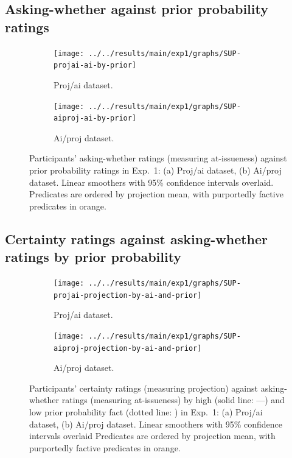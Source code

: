 \documentclass[11pt,fleqn]{article}
\newcommand{\6}{\mbox{$[\hspace*{-.6mm}[$}}
\newcommand{\9}{\mbox{$]\hspace*{-.6mm}]$}}
\begin{document}
\subsection{Asking-whether against prior probability ratings}

\begin{figure}[h!]
\centering
\begin{subfigure}[t]{0.49\textwidth}
\centering
\texttt{[image: ../../results/main/exp1/graphs/SUP-projai-ai-by-prior]}
\caption{Proj/ai dataset.}
\end{subfigure} \hfill \begin{subfigure}[t]{0.49\textwidth}
\centering
\texttt{[image: ../../results/main/exp1/graphs/SUP-aiproj-ai-by-prior]}
\caption{Ai/proj dataset.}
 \end{subfigure}
 
  
\caption{Participants' asking-whether ratings (measuring at-issueness) against prior probability ratings in Exp.~1: (a) Proj/ai dataset, (b) Ai/proj dataset. Linear smoothers with 95\% confidence intervals overlaid. Predicates are ordered by projection mean, with purportedly factive predicates in orange.}
\end{figure}

\subsection{Certainty ratings against asking-whether ratings by prior probability}

\begin{figure}[h!]
\centering
\begin{subfigure}[t]{0.49\textwidth}
\centering
\texttt{[image: ../../results/main/exp1/graphs/SUP-projai-projection-by-ai-and-prior]}
\caption{Proj/ai dataset.}
\end{subfigure} \hfill \begin{subfigure}[t]{0.49\textwidth}
\centering
\texttt{[image: ../../results/main/exp1/graphs/SUP-aiproj-projection-by-ai-and-prior]}
\caption{Ai/proj dataset.}
 \end{subfigure}
 
  
\caption{Participants' certainty ratings (measuring projection) against asking-whether ratings (measuring at-issueness) by high (solid line: ---) and low prior probability fact (dotted line: \raisebox{1mm}{\ldots}) in Exp.~1: (a) Proj/ai dataset, (b) Ai/proj dataset. Linear smoothers with 95\% confidence intervals overlaid Predicates are ordered by projection mean, with purportedly factive predicates in orange.}
\end{figure}
\end{document}
